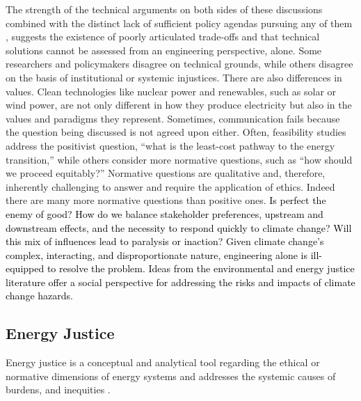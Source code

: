 The strength of the technical arguments on both sides of these discussions
combined with the distinct lack of sufficient policy agendas pursuing any of
them \cite{roelfsema_taking_2020,hale_assessing_2022}, suggests the existence of
poorly articulated trade-offs and that technical solutions cannot be assessed
from an engineering perspective, alone. Some researchers and policymakers
disagree on technical grounds, while others disagree on the basis of
institutional or systemic injustices. There are also differences in values.
Clean technologies like nuclear power and renewables, such as solar or wind
power, are not only different in how they produce electricity but also in the
values and paradigms they represent. Sometimes, communication fails because the
question being discussed is not agreed upon either. Often, feasibility studies
address the positivist question, ``what is the least-cost pathway to the energy
transition,'' while others consider more normative questions, such as ``how
should we proceed equitably?'' Normative questions are qualitative and,
therefore, inherently challenging to answer and require the application of
ethics. Indeed there are many more normative questions than positive ones.
\textcolor{black}{Is perfect the enemy of good? How do we balance stakeholder
preferences, upstream and downstream effects, and the necessity to respond
quickly to climate change? Will this mix of influences lead to paralysis or
inaction?} \textcolor{black}{Given climate change's complex, interacting, and
disproportionate nature, engineering alone is ill-equipped to resolve the
problem. Ideas from the environmental and energy justice literature offer a
social perspective for addressing the risks and impacts of climate change
hazards.}
\subsection{Energy Justice}



Energy justice is a conceptual and analytical tool regarding the ethical or
normative dimensions of energy systems and addresses the systemic causes of
burdens, and inequities \cite{sovacool_energy_2015}. 

    
